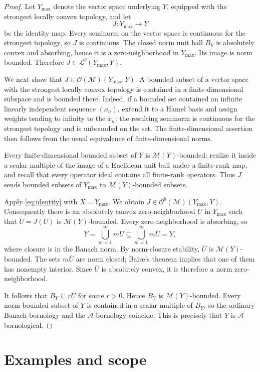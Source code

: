 \documentclass[11pt]{article}
\newcommand{\A}{\mathcal A}
\newcommand{\M}{\mathcal M}
\newcommand{\Lcal}{\mathcal L}
\newcommand{\Ocal}{\mathcal O}
\begin{document}
\begin{proof}
Let $Y_{\max}$ denote the vector space underlying $Y$, equipped with the
strongest locally convex topology, and let
\[
 J:Y_{\max}\longrightarrow Y
\]
be the identity map.  Every seminorm on the vector space is continuous for
the strongest topology, so $J$ is continuous.  The closed norm unit ball
$B_Y$ is absolutely convex and absorbing, hence it is a zero-neighborhood in
$Y_{\max}$.  Its image is norm bounded.  Therefore
$J\in\Lcal^b(Y_{\max},Y)$.

We next show that $J\in\Ocal(\M)(Y_{\max},Y)$.  A bounded subset of a vector
space with the strongest locally convex topology is contained in a
finite-dimensional subspace and is bounded there.  Indeed, if a bounded set
contained an infinite linearly independent sequence $(x_n)$, extend it to a
Hamel basis and assign weights tending to infinity to the $x_n$; the
resulting seminorm is continuous for the strongest topology and is unbounded
on the set.  The finite-dimensional assertion then follows from the usual
equivalence of finite-dimensional norms.

Every finite-dimensional bounded subset of $Y$ is $\M(Y)$-bounded: realize
it inside a scalar multiple of the image of a Euclidean unit ball under a
finite-rank map, and recall that every operator ideal contains all
finite-rank operators.  Thus $J$ sends bounded subsets of $Y_{\max}$ to
$\M(Y)$-bounded subsets.

Apply \eqref{eq:identity} with $X=Y_{\max}$.  We obtain
$J\in\Ocal^b(\M)(Y_{\max},Y)$.  Consequently there is an absolutely convex
zero-neighborhood $U$ in $Y_{\max}$ such that $U=J(U)$ is
$\M(Y)$-bounded.  Every zero-neighborhood is absorbing, so
\[
 Y=\bigcup_{m=1}^{\infty}mU
   \subseteq\bigcup_{m=1}^{\infty}m\overline U=Y,
\]
where closure is in the Banach norm.  By norm-closure stability,
$\overline U$ is $\M(Y)$-bounded.  The sets $m\overline U$ are norm closed;
Baire's theorem implies that one of them has nonempty interior.  Since
$\overline U$ is absolutely convex, it is therefore a norm
zero-neighborhood.

It follows that $B_Y\subseteq r\overline U$ for some $r>0$.  Hence $B_Y$ is
$\M(Y)$-bounded.  Every norm-bounded subset of $Y$ is contained in a scalar
multiple of $B_Y$, so the ordinary Banach bornology and the $\A$-bornology
coincide.  This is precisely that $Y$ is $\A$-bornological.
\end{proof}

\section{Examples and scope}
\end{document}
